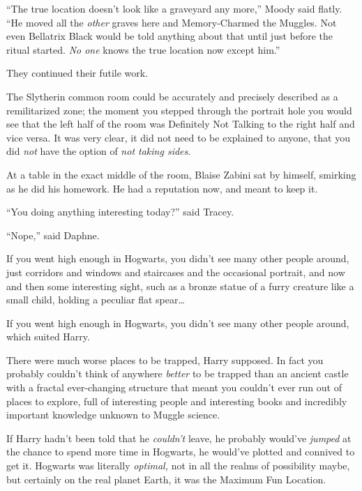 “The true location doesn’t look like a graveyard any more,” Moody said flatly. “He moved all the \emph{other} graves here and Memory-Charmed the Muggles. Not even Bellatrix Black would be told anything about that until just before the ritual started. \emph{No one} knows the true location now except him.”

They continued their futile work.


The Slytherin common room could be accurately and precisely described as a remilitarized zone; the moment you stepped through the portrait hole you would see that the left half of the room was Definitely Not Talking to the right half and vice versa. It was very clear, it did not need to be explained to anyone, that you did \emph{not} have the option of \emph{not taking sides}.

At a table in the exact middle of the room, Blaise Zabini sat by himself, smirking as he did his homework. He had a reputation now, and meant to keep it.


“You doing anything interesting today?” said Tracey.

“Nope,” said Daphne.


If you went high enough in Hogwarts, you didn’t see many other people around, just corridors and windows and staircases and the occasional portrait, and now and then some interesting sight, such as a bronze statue of a furry creature like a small child, holding a peculiar flat spear…

If you went high enough in Hogwarts, you didn’t see many other people around, which suited Harry.

There were much worse places to be trapped, Harry supposed. In fact you probably couldn’t think of anywhere \emph{better} to be trapped than an ancient castle with a fractal ever-changing structure that meant you couldn’t ever run out of places to explore, full of interesting people and interesting books and incredibly important knowledge unknown to Muggle science.

If Harry hadn’t been told that he \emph{couldn’t} leave, he probably would’ve \emph{jumped} at the chance to spend more time in Hogwarts, he would’ve plotted and connived to get it. Hogwarts was literally \emph{optimal,} not in all the realms of possibility maybe, but certainly on the real planet Earth, it was the Maximum Fun Location.

